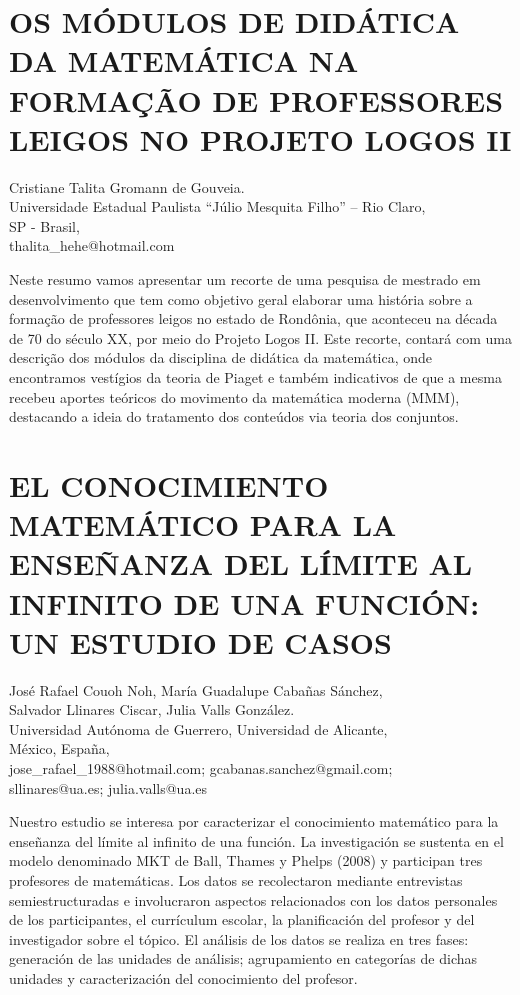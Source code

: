 \section{OS MÓDULOS DE DIDÁTICA DA MATEMÁTICA NA FORMAÇÃO DE PROFESSORES LEIGOS
NO PROJETO LOGOS II}

\begin{datos}
Cristiane Talita Gromann de Gouveia. \\
 Universidade Estadual Paulista “Júlio Mesquita Filho” – Rio Claro, \\
\hfill SP - Brasil, \\
 \hfill  thalita\_{}hehe@hotmail.com
\end{datos}

Neste resumo vamos apresentar um recorte de uma pesquisa de mestrado
em desenvolvimento que tem como objetivo geral elaborar uma história
sobre a formação de professores leigos no estado de Rondônia, que
aconteceu na década de 70 do século XX, por meio do Projeto Logos
II. Este recorte, contará com uma descrição dos módulos da disciplina
de didática da matemática, onde encontramos vestígios da teoria de
Piaget e também indicativos de que a mesma recebeu aportes teóricos
do movimento da matemática moderna (MMM), destacando a ideia do tratamento
dos conteúdos via teoria dos conjuntos.


\section{EL CONOCIMIENTO MATEMÁTICO PARA LA ENSEÑANZA DEL LÍMITE AL INFINITO
DE UNA FUNCIÓN: UN ESTUDIO DE CASOS}

\begin{datos}
José Rafael Couoh Noh, María Guadalupe Cabañas Sánchez, \\
Salvador Llinares Ciscar, Julia Valls González. \\
 Universidad Autónoma de Guerrero, Universidad de Alicante, \\
\hfill México, España, \\
 \hfill  jose\_{}rafael\_{}1988@hotmail.com; gcabanas.sanchez@gmail.com;\\
\hfill sllinares@ua.es; julia.valls@ua.es
\end{datos}

Nuestro estudio se interesa por caracterizar el conocimiento matemático
para la enseñanza del límite al infinito de una función. La investigación
se sustenta en el modelo denominado MKT de Ball, Thames y Phelps (2008)
y participan tres profesores de matemáticas. Los datos se recolectaron
mediante entrevistas semiestructuradas e involucraron aspectos relacionados
con los datos personales de los participantes, el currículum escolar,
la planificación del profesor y del investigador sobre el tópico.
El análisis de los datos se realiza en tres fases: generación de las
unidades de análisis; agrupamiento en categorías de dichas unidades
y caracterización del conocimiento del profesor.


